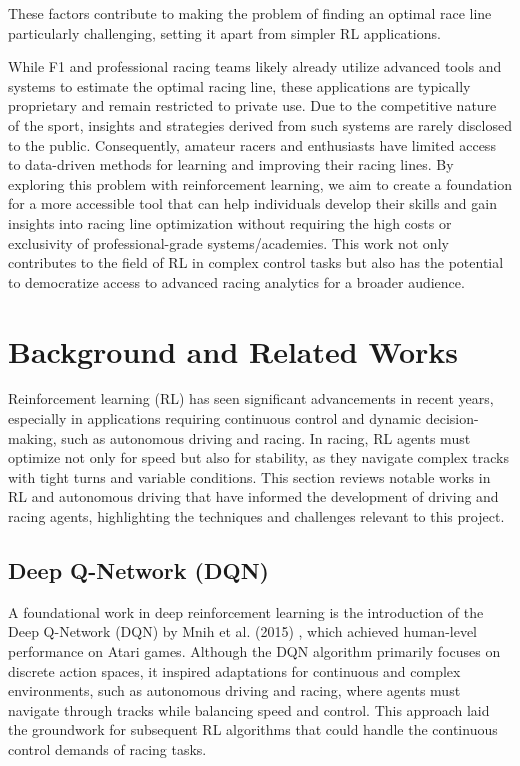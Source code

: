 \documentclass{article}
\begin{document}
These factors contribute to making the problem of finding an optimal race line particularly challenging, setting it apart from simpler RL applications.

While F1 and professional racing teams likely already utilize advanced tools and systems to estimate the optimal racing line, these applications are typically proprietary and remain restricted to private use. Due to the competitive nature of the sport, insights and strategies derived from such systems are rarely disclosed to the public. Consequently, amateur racers and enthusiasts have limited access to data-driven methods for learning and improving their racing lines. By exploring this problem with reinforcement learning, we aim to create a foundation for a more accessible tool that can help individuals develop their skills and gain insights into racing line optimization without requiring the high costs or exclusivity of professional-grade systems/academies. This work not only contributes to the field of RL in complex control tasks but also has the potential to democratize access to advanced racing analytics for a broader audience.

\section{Background and Related Works}

Reinforcement learning (RL) has seen significant advancements in recent years, especially in applications requiring continuous control and dynamic decision-making, such as autonomous driving and racing. In racing, RL agents must optimize not only for speed but also for stability, as they navigate complex tracks with tight turns and variable conditions. This section reviews notable works in RL and autonomous driving that have informed the development of driving and racing agents, highlighting the techniques and challenges relevant to this project.

\subsection{Deep Q-Network (DQN)}
A foundational work in deep reinforcement learning is the introduction of the Deep Q-Network (DQN) by Mnih et al. (2015) \cite{mnih2015human}, which achieved human-level performance on Atari games. Although the DQN algorithm primarily focuses on discrete action spaces, it inspired adaptations for continuous and complex environments, such as autonomous driving and racing, where agents must navigate through tracks while balancing speed and control. This approach laid the groundwork for subsequent RL algorithms that could handle the continuous control demands of racing tasks.
\end{document}
